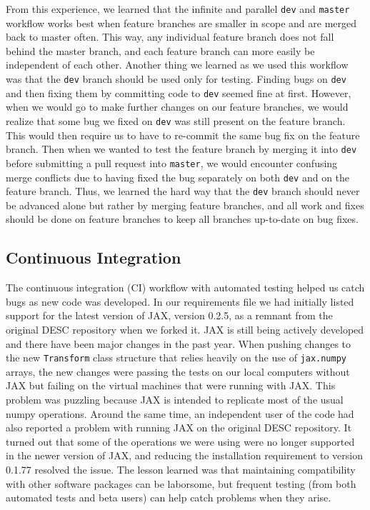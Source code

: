 \documentclass{article}
\begin{document}
From this experience, we learned that the infinite and parallel \texttt{dev} and \texttt{master} workflow works best when feature branches are smaller in scope and are merged back to master often.
This way, any individual feature branch does not fall behind the master branch, and each feature branch can more easily be independent of each other.
Another thing we learned as we used this workflow was that the \texttt{dev} branch should be used only for testing.
Finding bugs on \texttt{dev} and then fixing them by committing code to \texttt{dev} seemed fine at first.
However, when we would go to make further changes on our feature branches, we would realize that some bug we fixed on \texttt{dev} was still present on the feature branch.
This would then require us to have to re-commit the same bug fix on the feature branch.
Then when we wanted to test the feature branch by merging it into \texttt{dev} before submitting a pull request into \texttt{master}, we would encounter confusing merge conflicts due to having fixed the bug separately on both \texttt{dev} and on the feature branch.
Thus, we learned the hard way that the \texttt{dev} branch should never be advanced alone but rather by merging feature branches, and all work and fixes should be done on feature branches to keep all branches up-to-date on bug fixes.

\subsection{Continuous Integration}

The continuous integration (CI) workflow with automated testing helped us catch bugs as new code was developed.
In our requirements file we had initially listed support for the latest version of JAX, version 0.2.5, as a remnant from the original DESC repository when we forked it.
JAX is still being actively developed and there have been major changes in the past year.
When pushing changes to the new \texttt{Transform} class structure that relies heavily on the use of \texttt{jax.numpy} arrays, the new changes were passing the tests on our local computers without JAX but failing on the virtual machines that were running with JAX.
This problem was puzzling because JAX is intended to replicate most of the usual numpy operations.
Around the same time, an independent user of the code had also reported a problem with running JAX on the original DESC repository.
It turned out that some of the operations we were using were no longer supported in the newer version of JAX, and reducing the installation requirement to version 0.1.77 resolved the issue.
The lesson learned was that maintaining compatibility with other software packages can be laborsome, but frequent testing (from both automated tests and beta users) can help catch problems when they arise.
\end{document}

